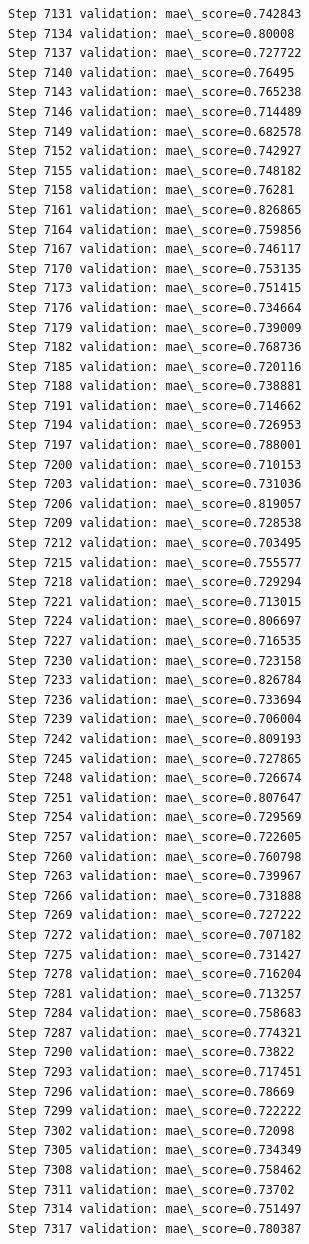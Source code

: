 \documentclass[11pt]{article}
\begin{document}
\begin{Verbatim}[commandchars=\\\{\}]
Step 7131 validation: mae\_score=0.742843
Step 7134 validation: mae\_score=0.80008
Step 7137 validation: mae\_score=0.727722
Step 7140 validation: mae\_score=0.76495
Step 7143 validation: mae\_score=0.765238
Step 7146 validation: mae\_score=0.714489
Step 7149 validation: mae\_score=0.682578
Step 7152 validation: mae\_score=0.742927
Step 7155 validation: mae\_score=0.748182
Step 7158 validation: mae\_score=0.76281
Step 7161 validation: mae\_score=0.826865
Step 7164 validation: mae\_score=0.759856
Step 7167 validation: mae\_score=0.746117
Step 7170 validation: mae\_score=0.753135
Step 7173 validation: mae\_score=0.751415
Step 7176 validation: mae\_score=0.734664
Step 7179 validation: mae\_score=0.739009
Step 7182 validation: mae\_score=0.768736
Step 7185 validation: mae\_score=0.720116
Step 7188 validation: mae\_score=0.738881
Step 7191 validation: mae\_score=0.714662
Step 7194 validation: mae\_score=0.726953
Step 7197 validation: mae\_score=0.788001
Step 7200 validation: mae\_score=0.710153
Step 7203 validation: mae\_score=0.731036
Step 7206 validation: mae\_score=0.819057
Step 7209 validation: mae\_score=0.728538
Step 7212 validation: mae\_score=0.703495
Step 7215 validation: mae\_score=0.755577
Step 7218 validation: mae\_score=0.729294
Step 7221 validation: mae\_score=0.713015
Step 7224 validation: mae\_score=0.806697
Step 7227 validation: mae\_score=0.716535
Step 7230 validation: mae\_score=0.723158
Step 7233 validation: mae\_score=0.826784
Step 7236 validation: mae\_score=0.733694
Step 7239 validation: mae\_score=0.706004
Step 7242 validation: mae\_score=0.809193
Step 7245 validation: mae\_score=0.727865
Step 7248 validation: mae\_score=0.726674
Step 7251 validation: mae\_score=0.807647
Step 7254 validation: mae\_score=0.729569
Step 7257 validation: mae\_score=0.722605
Step 7260 validation: mae\_score=0.760798
Step 7263 validation: mae\_score=0.739967
Step 7266 validation: mae\_score=0.731888
Step 7269 validation: mae\_score=0.727222
Step 7272 validation: mae\_score=0.707182
Step 7275 validation: mae\_score=0.731427
Step 7278 validation: mae\_score=0.716204
Step 7281 validation: mae\_score=0.713257
Step 7284 validation: mae\_score=0.758683
Step 7287 validation: mae\_score=0.774321
Step 7290 validation: mae\_score=0.73822
Step 7293 validation: mae\_score=0.717451
Step 7296 validation: mae\_score=0.78669
Step 7299 validation: mae\_score=0.722222
Step 7302 validation: mae\_score=0.72098
Step 7305 validation: mae\_score=0.734349
Step 7308 validation: mae\_score=0.758462
Step 7311 validation: mae\_score=0.73702
Step 7314 validation: mae\_score=0.751497
Step 7317 validation: mae\_score=0.780387

\end{Verbatim}
\end{document}
